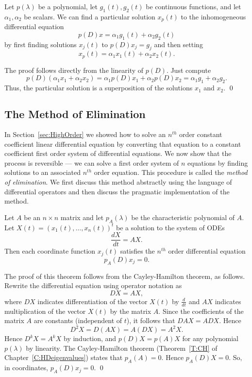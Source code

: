 \documentclass{ximera}
\begin{document}
\begin{lemma}  \label{L:inhsup}
Let $p(\lambda)$ be a polynomial, let $g_1(t),g_2(t)$ be continuous 
functions, and let $\alpha_1,\alpha_2$ be scalars.  We can find a particular 
solution $x_p(t)$ to the inhomogeneous differential equation
\[
p(D)x = \alpha_1g_1(t) + \alpha_2g_2(t)
\]
by first finding solutions $x_j(t)$ to $p(D)x_j = g_j$ and then setting 
\[
x_p(t) = \alpha_1x_1(t) + \alpha_2x_2(t).
\]
\end{lemma}

\proof  The proof follows directly from the linearity of $p(D)$.  Just 
compute
\[
p(D)(\alpha_1x_1 + \alpha_2x_2) = \alpha_1p(D)x_1 + 
\alpha_2p(D)x_2 = \alpha_1g_1 + \alpha_2g_2.
\]
Thus, the particular solution is a superposition of the solutions $x_1$ and
$x_2$.  \qed

\subsection*{The Method of Elimination}

In Section~\ref{sec:HighOrder} we showed how to solve an $n^{th}$ order 
constant coefficient linear differential equation by converting that equation 
to a constant coefficient first order system of differential equations.  We 
now show that the process is reversible --- we can solve a first order 
system of $n$ equations by finding solutions to an associated $n^{th}$ order 
equation.  This procedure is called the {\em method of elimination\/}.
  We first discuss this method abstractly using 
the language of differential operators and then discuss the pragmatic 
implementation of the method.

\begin{thm}  \label{T:Elimination}
Let $A$ be an $n\times n$ matrix and let $p_A(\lambda)$ be the characteristic 
polynomial of $A$.  Let $X(t)=(x_1(t),\ldots,x_n(t))^t$ be a solution to the 
system of ODEs 
\[
\frac{dX}{dt} = AX.
\]
Then each coordinate function $x_j(t)$ satisfies the $n^{th}$ order 
differential equation
\begin{equation}  \label{E:Elimination}
p_A(D)x_j = 0.
\end{equation}
\end{thm}

\proof  The proof of this theorem follows from the Cayley-Hamilton 
theorem, as follows.   Rewrite the differential equation using operator 
notation as  
\[
DX = AX,
\]
where $DX$ indicates differentiation of the vector $X(t)$ by $\frac{d}{dt}$ 
and $AX$ indicates multiplication of the vector $X(t)$ by the matrix $A$.
Since the coefficients of the matrix $A$ are constants (independent of $t$), 
it follows that $DAX=ADX$.  Hence
\[
D^2X = D(AX) = A(DX) = A^2X.
\]
Hence $D^kX = A^kX$ by induction, and $p(D)X = p(A)X$ for any polynomial $p(\lambda)$ by linearity.  The Cayley-Hamilton theorem (Theorem~\ref{T:CH} 
of Chapter~\ref{C:HDeigenvalues}) states that $p_A(A)=0$.  Hence $p_A(D)X=0$.  
So, in coordinates, $p_A(D)x_j=0$. \qed
\end{document}
